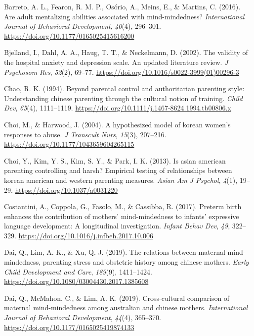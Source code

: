 \documentclass[
]{article}
\newlength{\cslhangindent}
\newlength{\cslentryspacingunit} %
\newenvironment{CSLReferences}[2] %
 {%
  \setlength{\parindent}{0pt}
  \ifodd #1
  \let\oldpar\par
  \def\par{\hangindent=\cslhangindent\oldpar}
  \fi
  \setlength{\parskip}{#2\cslentryspacingunit}
 }%
 {}
\begin{document}
\begin{CSLReferences}{1}{0}
\leavevmode{}%
Barreto, A. L., Fearon, R. M. P., Osório, A., Meins, E., \& Martins, C. (2016). Are adult mentalizing abilities associated with mind-mindedness? \emph{International Journal of Behavioral Development}, \emph{40}(4), 296--301. \url{https://doi.org/10.1177/0165025415616200}

\leavevmode{}%
Bjelland, I., Dahl, A. A., Haug, T. T., \& Neckelmann, D. (2002). The validity of the hospital anxiety and depression scale. An updated literature review. \emph{J Psychosom Res}, \emph{52}(2), 69--77. \url{https://doi.org/10.1016/s0022-3999(01)00296-3}

\leavevmode{}%
Chao, R. K. (1994). Beyond parental control and authoritarian parenting style: Understanding chinese parenting through the cultural notion of training. \emph{Child Dev}, \emph{65}(4), 1111--1119. \url{https://doi.org/10.1111/j.1467-8624.1994.tb00806.x}

\leavevmode{}%
Choi, M., \& Harwood, J. (2004). A hypothesized model of korean women's responses to abuse. \emph{J Transcult Nurs}, \emph{15}(3), 207--216. \url{https://doi.org/10.1177/1043659604265115}

\leavevmode{}%
Choi, Y., Kim, Y. S., Kim, S. Y., \& Park, I. K. (2013). Is asian american parenting controlling and harsh? Empirical testing of relationships between korean american and western parenting measures. \emph{Asian Am J Psychol}, \emph{4}(1), 19--29. \url{https://doi.org/10.1037/a0031220}

\leavevmode{}%
Costantini, A., Coppola, G., Fasolo, M., \& Cassibba, R. (2017). Preterm birth enhances the contribution of mothers' mind-mindedness to infants' expressive language development: A longitudinal investigation. \emph{Infant Behav Dev}, \emph{49}, 322--329. \url{https://doi.org/10.1016/j.infbeh.2017.10.006}

\leavevmode{}%
Dai, Q., Lim, A. K., \& Xu, Q. J. (2019). The relations between maternal mind-mindedness, parenting stress and obstetric history among chinese mothers. \emph{Early Child Development and Care}, \emph{189}(9), 1411--1424. \url{https://doi.org/10.1080/03004430.2017.1385608}

\leavevmode{}%
Dai, Q., McMahon, C., \& Lim, A. K. (2019). Cross-cultural comparison of maternal mind-mindedness among australian and chinese mothers. \emph{International Journal of Behavioral Development}, \emph{44}(4), 365--370. \url{https://doi.org/10.1177/0165025419874133}


\end{CSLReferences}
\end{document}
